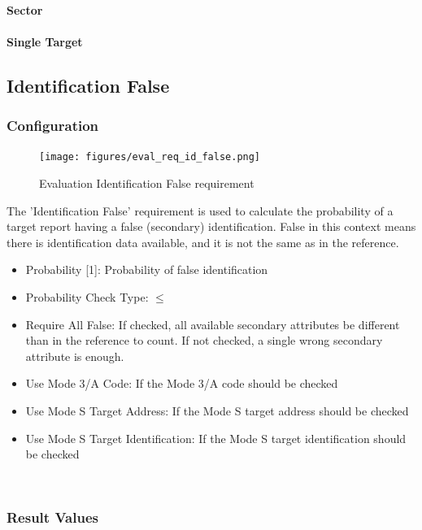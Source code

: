 \paragraph{Sector}
\paragraph{Single Target}

\subsection{Identification False}
\label{sec:eval_req_id_false} 

\subsubsection{Configuration}

\begin{figure}[H]
    \texttt{[image: figures/eval\_req\_id\_false.png]}
  \caption{Evaluation Identification False requirement}
\end{figure}

The 'Identification False' requirement is used to calculate the probability of a target report having a false (secondary) identification. False in this context means there is identification data available, and it is not the same as in the reference. \\

\begin{itemize}  
\item Probability [1]: Probability of false identification
\item Probability Check Type: $\leq$
\item Require All False: If checked, all available secondary attributes be different than in the reference to count. If not checked, a single wrong secondary attribute is enough.
\item Use Mode 3/A Code: If the Mode 3/A code should be checked
\item Use Mode S Target Address: If the Mode S target address should be checked
\item Use Mode S Target Identification: If the Mode S target identification should be checked
\end{itemize}
\ \\

\subsubsection{Result Values}

